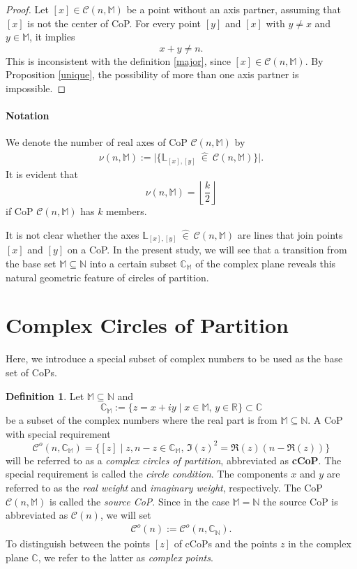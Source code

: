 \documentclass[12pt]{amsart}
\theoremstyle{definition}
\newtheorem{definition}[theorem]{Definition}
\theoremstyle{remark}
\numberwithin{equation}{section}
\newcommand{\abs}[1]{\lvert#1\rvert}
\newcommand{\inn}{~ \hat{\in}~ }
\newcommand{\C}{\mathcal{C}}
\newcommand{\CC}{\mathbb{C}}
\newcommand{\M}{\mathbb{M}}
\newcommand{\N}{\mathbb{N}}
\newcommand{\LL}{\mathbb{L}}
\begin{document}
\begin{proof}
Let $[x] \in \C(n,\M)$ be a point without an axis partner, assuming that $[x]$ is not the center of CoP. For every point $[y]$ and $[x]$ with $y\neq x$ and $y \in \M$, it implies
\[
x+y\neq n.
\]
This is inconsistent with the definition \ref{major}, since $[x] \in \C(n,\M)$. By Proposition \ref{unique}, the possibility of more than one axis partner is impossible.
\end{proof}

\paragraph*{\textbf{Notation}}
We denote the number of real axes of CoP $\C(n,\M)$ by 
\begin{align}\label{axesOfCoP}
\nu(n,\M):=\abs{\{\LL_{[x],[y]}\inn \C(n,\M)\}}.
\end{align}
It is evident that
\[
\nu(n,\M)=\left\lfloor\frac{k}{2}\right\rfloor
\]
if CoP $\C(n,\M)$ has $k$ members.
\bigskip

It is not clear whether the axes $\LL_{[x],[y]}\inn \C(n,\M)$ are lines that join points $[x]$ and $[y]$ on a CoP. In the present study, we will see that a transition from the base set $\M\subseteq \N$ into a certain subset $\CC_{\M}$ of the complex plane reveals this natural geometric feature of circles of partition. 


\section{Complex Circles of Partition}

Here, we introduce a special subset of complex numbers to be used as the base set of CoPs.

\begin{definition}\label{D_cCoP}
Let $\M \subseteq \N$ and
\[
\CC_{\M}:=\lbrace z=x+iy\mid x\in \M, \, y\in \mathbb{R}\rbrace \subset \CC
\]
be a subset of the complex numbers where the real part is from $\M \subseteq \N$. A CoP with special requirement
\[
\C^o(n,\CC_{\M})=\lbrace [z]\mid z, n-z\in \CC_{\M}, \,\Im(z)^2 = \Re(z)\left(n-\Re(z)\right)\rbrace
\]
will be referred to as a \emph{complex circles of partition}, abbreviated as \textbf{cCoP}. The special requirement is called the \emph{circle condition}. The components $x$ and $y$ are referred to as the \emph{real weight} and \emph{imaginary weight}, respectively. The CoP $\C(n,\M)$ is called the \emph{source CoP}. Since in the case $\M = \N$ the source CoP is abbreviated as $\C(n)$, we will set
\begin{align}
\C^o(n):=\C^o(n, \CC_{\N}).\label{E-cCoP(N)}
\end{align}
To distinguish between the points $[z]$ of cCoPs and the points $z$ in the complex plane $\CC$, we refer to the latter as \emph{complex points}.
\end{definition}
\end{document}
